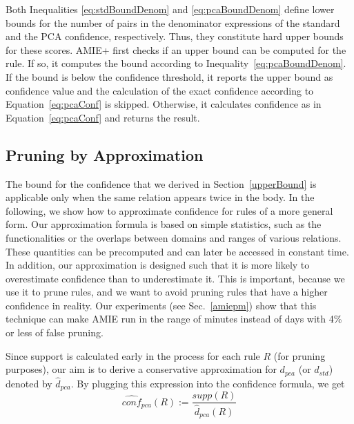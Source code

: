 {Both Inequalities \ref{eq:stdBoundDenom} and \ref{eq:pcaBoundDenom}
define lower bounds for the number of pairs in the denominator expressions of the standard
and the PCA confidence, respectively. Thus, they constitute hard upper bounds for these scores.
AMIE+ first checks if an upper bound can be computed for the rule. If so, it computes the bound according to Inequality~\ref{eq:pcaBoundDenom}.
If the bound is below the confidence threshold, it reports the upper bound as confidence value and the calculation of the exact confidence according to Equation~\ref{eq:pcaConf} is skipped.
Otherwise, it calculates confidence as in Equation~\ref{eq:pcaConf} and returns the result.


\subsection{Pruning by Approximation}
\label{subsec:pruningbyapprox}


The bound for the confidence that we derived in Section~\ref{upperBound} is applicable only when the same relation appears twice in the body.
In the following, we show how to approximate confidence for rules of a more general form. 
Our approximation formula is based on simple statistics, such as the functionalities or the overlaps between domains and ranges of various relations. These quantities
can be precomputed and can later be accessed in constant time. In addition, our approximation is designed such that it is more likely to overestimate confidence than to underestimate it.
This is important, because we use it to prune rules, and we want to avoid pruning rules that have a higher confidence in reality.
Our experiments (see Sec.~\ref{amiepm}) show that this technique can make AMIE run in the range of minutes instead of days with 4\% or less of false pruning.

Since support is calculated early in the process for each rule $R$ (for pruning purposes), 
our aim is to derive a conservative approximation for $d_{pca}$ (or $d_{std}$) denoted by
$\widehat{d}_{pca}$. By plugging this expression into the confidence formula, we get
\begin{equation} \label{eq:pcaApproxConf}
  \widehat{conf}_{pca}(R):=\frac{supp(R)}{\widehat{d}_{pca}(R)}
\end{equation}

}
